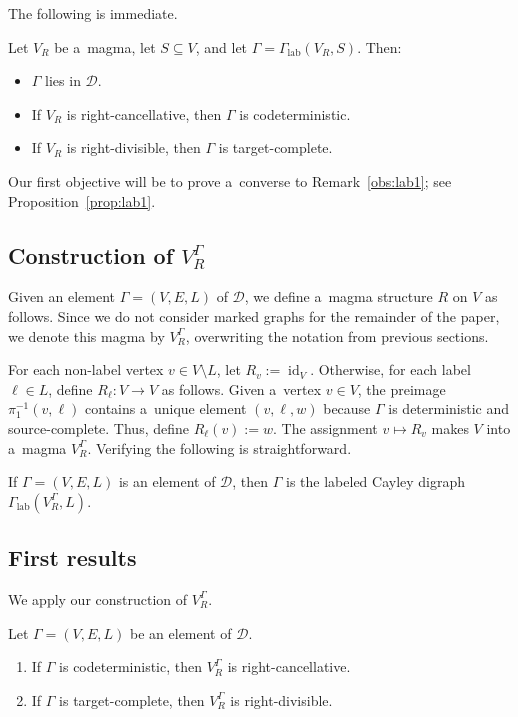 \documentclass{jonasart}
\DeclareMathOperator{\id}{id}
\DeclareMathOperator{\lab}{lab}
\newcommand{\inv}{^{-1}}
\begin{document}
	The following is immediate.
	\begin{remark}\label{obs:lab1}
		Let $V_R$ be a~magma, let $S\subseteq V$, and let $\Gamma=\Gamma_{\lab}(V_R,S)$. Then:
		\begin{itemize}
			\item $\Gamma$ lies in $ \mathcal{D}$.
			\item If $V_R$ is right-cancellative, then $\Gamma$ is codeterministic.
			\item If $V_R$ is right-divisible, then $\Gamma$ is target-complete.
		\end{itemize}
	\end{remark}
    
	Our first objective will be to prove a~converse to Remark~\ref{obs:lab1}; see Proposition~\ref{prop:lab1}.

	\subsection{Construction of $V^\Gamma_R$}

	Given an element $\Gamma=(V,E,L)$ of $\mathcal{D}$, we define a~magma structure $R$ on $V$ as follows. Since we do not consider marked graphs for the remainder of the paper, we denote this magma by $V^\Gamma_R$, overwriting the notation from previous sections.

	For each non-label vertex $v\in V\setminus L$, let $R_v:=\id_V$. Otherwise, for each label $\ell\in L$, define ${R_\ell:V\to V}$ as follows. Given a~vertex $v\in V$, the preimage $\pi_1\inv(v,\ell)$ contains a~unique element $(v,\ell,w)$ because $\Gamma$ is deterministic and source-complete. Thus, define $R_\ell(v):=w$. The assignment $v\mapsto R_v$ makes $V$ into a~magma $V^\Gamma_R$. Verifying the following is straightforward.
    
	\begin{remark}\label{obs:lab0}
		If $\Gamma=(V,E,L)$ is an element of $\mathcal{D}$, then $\Gamma$ is the labeled Cayley digraph $\Gamma_{\lab}(V^\Gamma_R,L)$.
	\end{remark}
    
	\subsection{First results}
	
    We apply our construction of $V^\Gamma_R$.
	
    \begin{proposition}\label{prop:lab1}
		Let $\Gamma=(V,E,L)$ be an element of $\mathcal{D}$.
		\begin{enumerate}
			\item If $\Gamma$ is codeterministic, then $V^\Gamma_R$ is right-cancellative.
			\item If $\Gamma$ is target-complete, then $V^\Gamma_R$ is right-divisible.
		\end{enumerate}
	\end{proposition}
\end{document}
